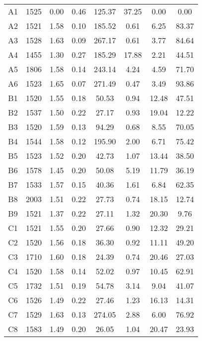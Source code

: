 \begin{table}[h!]
\begin{tabular}{c c c c c c c c}
			A1	 & 	1525	 & 	0.00	 & 	0.46	 & 	125.37	 & 	37.25	 & 	0.00	 & 	0.00  \\
			A2	 & 	1521	 & 	1.58	 & 	0.10	 & 	185.52	 & 	0.61	 & 	6.25	 & 	83.37 \\
			A3	 & 	1528	 & 	1.63	 & 	0.09	 & 	267.17	 & 	0.61	 & 	3.77	 & 	84.64 \\
			A4	 & 	1455	 & 	1.30	 & 	0.27	 & 	185.29	 & 	17.88	 & 	2.21	 & 	44.51 \\
			A5	 & 	1806	 & 	1.58	 & 	0.14	 & 	243.14	 & 	4.24	 & 	4.59	 & 	71.70 \\
			A6	 & 	1523	 & 	1.65	 & 	0.07	 & 	271.49	 & 	0.47	 & 	3.49	 & 	93.86 \\
			B1	 & 	1520	 & 	1.55	 & 	0.18	 & 	50.53	 & 	0.94	 & 	12.48	 & 	47.51 \\
			B2	 & 	1537	 & 	1.50	 & 	0.22	 & 	27.17	 & 	0.93	 & 	19.04	 & 	12.22 \\
			B3	 & 	1520	 & 	1.59	 & 	0.13	 & 	94.29	 & 	0.68	 & 	8.55	 & 	70.05 \\
			B4	 & 	1544	 & 	1.58	 & 	0.12	 & 	195.90	 & 	2.00	 & 	6.71	 & 	75.42 \\
			B5	 & 	1523	 & 	1.52	 & 	0.20	 & 	42.73	 & 	1.07	 & 	13.44	 & 	38.50 \\
			B6	 & 	1578	 & 	1.45	 & 	0.20	 & 	50.08	 & 	5.19	 & 	11.79	 & 	36.19 \\
			B7	 & 	1533	 & 	1.57	 & 	0.15	 & 	40.36	 & 	1.61	 & 	6.84	 & 	62.35 \\
			B8	 & 	2003	 & 	1.51	 & 	0.22	 & 	27.73	 & 	0.74	 & 	18.15	 & 	12.74 \\
			B9	 & 	1521	 & 	1.37	 & 	0.22	 & 	27.11	 & 	1.32	 & 	20.30	 & 	9.76 \\
			C1	 & 	1521	 & 	1.55	 & 	0.20	 & 	27.66	 & 	0.90	 & 	12.32	 & 	29.21 \\
			C2	 & 	1520	 & 	1.56	 & 	0.18	 & 	36.30	 & 	0.92	 & 	11.11	 & 	49.20 \\
			C3	 & 	1710	 & 	1.60	 & 	0.18	 & 	24.39	 & 	0.74	 & 	20.46	 & 	27.03 \\
			C4	 & 	1520	 & 	1.58	 & 	0.14	 & 	52.02	 & 	0.97	 & 	10.45	 & 	62.91 \\
			C5	 & 	1732	 & 	1.51	 & 	0.19	 & 	54.78	 & 	3.14	 & 	9.04	 & 	41.07 \\
			C6	 & 	1526	 & 	1.49	 & 	0.22	 & 	27.46	 & 	1.23	 & 	16.13	 & 	14.31 \\
			C7	 & 	1529	 & 	1.63	 & 	0.13	 & 	274.05	 & 	2.88	 & 	6.00	 & 	76.92 \\
			C8	 & 	1583	 & 	1.49	 & 	0.20	 & 	26.05	 & 	1.04	 & 	20.47	 & 	23.93 \\

\end{tabular}
\end{table}
